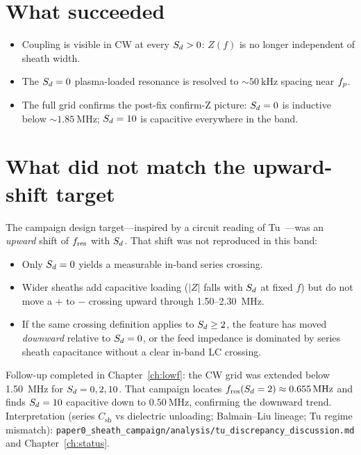 \section{What succeeded}

\begin{itemize}[leftmargin=1.5em]
\item Coupling is visible in CW at every \(S_d>0\): \(Z(f)\) is no longer independent of sheath width.
\item The \(S_d=0\) plasma-loaded resonance is resolved to \(\sim\SI{50}{\kilo\hertz}\) spacing near \(f_p\).
\item The full grid confirms the post-fix confirm-Z picture: \(S_d=0\) is inductive below \(\sim\SI{1.85}{\mega\hertz}\); \(S_d=10\) is capacitive everywhere in the band.
\end{itemize}

\section{What did not match the upward-shift target}

The campaign design target---inspired by a circuit reading of Tu~\cite{tu2008}---was an \emph{upward} shift of \(f_{\mathrm{res}}\) with \(S_d\). That shift was not reproduced in this band:

\begin{itemize}[leftmargin=1.5em]
\item Only \(S_d=0\) yields a measurable in-band series crossing.
\item Wider sheaths add capacitive loading (\(\lvert Z\rvert\) falls with \(S_d\) at fixed \(f\)) but do not move a \(+\) to \(-\) crossing upward through 1.50--2.30~MHz.
\item If the same crossing definition applies to \(S_d\ge 2\), the feature has moved \emph{downward} relative to \(S_d=0\), or the feed impedance is dominated by series sheath capacitance without a clear in-band LC crossing.
\end{itemize}

Follow-up completed in Chapter~\ref{ch:lowf}: the CW grid was extended below 1.50~MHz for \(S_d=0,2,10\). That campaign locates \(f_{\mathrm{res}}(S_d=2)\approx\SI{0.655}{\mega\hertz}\) and finds \(S_d=10\) capacitive down to \(\SI{0.50}{\mega\hertz}\), confirming the downward trend. Interpretation (series \(C_{\mathrm{sh}}\) vs dielectric unloading; Balmain--Liu lineage; Tu regime mismatch): \texttt{paper0_sheath_campaign/analysis/tu\_discrepancy\_discussion.md} and Chapter~\ref{ch:status}.
